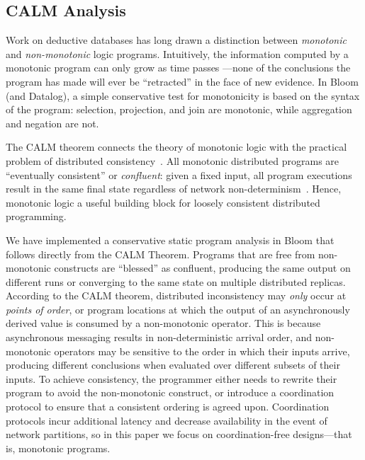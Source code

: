 \subsection{CALM Analysis}
\label{sec:bg-calm}

Work on deductive databases has long drawn a distinction between
\emph{monotonic} and \emph{non-monotonic} logic programs. Intuitively, 
the information computed by a monotonic program can only grow as time passes
---none of the conclusions the program has made will ever be ``retracted'' in
the face of new evidence.
In Bloom
(and Datalog), a simple conservative test for monotonicity is based on the
syntax of the program: selection, projection, and join are monotonic, while
aggregation and negation are not.

The CALM theorem connects the theory of monotonic logic with the practical
problem of distributed consistency~\cite{Alvaro2011,Hellerstein2010}. 
All monotonic distributed programs are ``eventually consistent'' or 
\emph{confluent}: given a fixed input, all program executions result in the
same final state regardless of network non-determinism~\cite{Ameloot2011,dedalus-pods12-tr}.
Hence, monotonic logic a useful
building block for loosely consistent distributed programming.

We have implemented a conservative static program analysis in Bloom
that follows directly from the CALM Theorem.  
Programs that are free from non-monotonic 
constructs are ``blessed'' as confluent, producing the same output 
on different 
runs or converging to the same state on multiple distributed replicas.
According to the CALM theorem, distributed inconsistency may \emph{only}
occur at \emph{points of order}, or program locations at which
the output of an asynchronously derived value is consumed by a non-monotonic
operator. 
This is because asynchronous messaging results in
non-deterministic arrival order, and non-monotonic operators may be
sensitive to the order in which their inputs arrive, producing different
conclusions when evaluated over different subsets of their inputs.
To achieve consistency, the programmer either needs to rewrite their
program to avoid the non-monotonic construct, or
introduce a coordination protocol to ensure that a consistent ordering is agreed
upon. Coordination protocols incur additional latency and decrease availability
in the event of network partitions, so in this paper we focus on
coordination-free designs---that is, monotonic programs.

